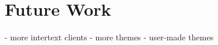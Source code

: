 
\section{Future Work} \label{futureWork}

- more intertext clients
- more themes
- user-made themes